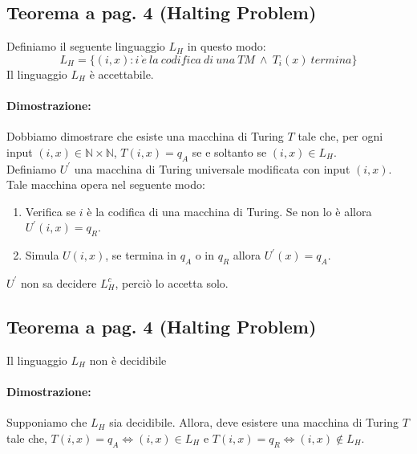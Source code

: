 \subsection{Teorema a pag. 4 (Halting Problem)}

Definiamo il seguente linguaggio $L_{H}$ in questo modo:
$$L_{H} = \{(i, x): i\ \grave{e}\ la\ codifica\ di\ una\ TM\ \land\ T_{i}(x)\ termina\}$$
Il linguaggio $L_{H}$ è accettabile.

\paragraph*{Dimostrazione:} Dobbiamo dimostrare che esiste una macchina di Turing $T$ tale che, per ogni
input $(i, x ) \in \mathbb{N} \times \mathbb{N}$, $T(i, x) = q_{A}$ se e soltanto se $(i, x) \in L_{H}$.\\ 
Definiamo $U^{'}$ una macchina di Turing universale modificata con input $(i, x)$.
Tale macchina opera nel seguente modo:
\begin{enumerate}
    \item Verifica se $i$ è la codifica di una macchina di Turing. Se non lo è allora $U^{'}(i, x) = q_{R}$.
    \item Simula $U(i, x)$, se termina in $q_{A}$ o in $q_{R}$ allora $U^{'}(x) = q_{A}$.
\end{enumerate}

$U^{'}$ non sa decidere $L_{H}^{c}$, perciò lo accetta solo.

\subsection{Teorema a pag. 4 (Halting Problem)}

Il linguaggio $L_{H}$ non è decidibile

\paragraph*{Dimostrazione:} Supponiamo che $L_{H}$ sia decidibile. Allora, deve esistere una macchina di Turing $T$ tale che, 
$T(i, x) = q_{A} \Leftrightarrow (i, x)\in L_{H}$ e $T(i, x) = q_{R} \Leftrightarrow (i, x)\notin L_{H}$.

